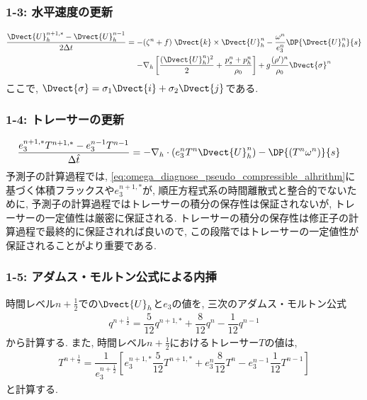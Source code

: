 \subsubsection*{1-3: 水平速度の更新}  
\vspace{-1cm}
\begin{align*}
 \dfrac{\Dvect{U}_h^{n+1,*} - \Dvect{U}_h^{n-1}}{2\Delta t}
 = -& (\zeta^n + f) \; \Dvect{k}\times\Dvect{U}^n_h 
   - \dfrac{\omega^n}{e_3^n} \DP{\Dvect{U}^n_h}{s} \nonumber \\
   -& \nabla_h \left[ \dfrac{(\Dvect{U}^n_h)^2}{2} 
      + \dfrac{p^n_s + p^n_h}{\rho_0} \right]
      + g\dfrac{(\rho')^n}{\rho_0}\Dvect{\sigma}^n 
\end{align*}
ここで, $\Dvect{\sigma}=\sigma_1 \Dvect{i} + \sigma_2 \Dvect{j}$である. 

\subsubsection*{1-4: トレーサーの更新}
\vspace{-1.2cm}
\begin{align*}
 \dfrac{e_3^{n+1,*}T^{n+1,*} - e_3^{n-1}T^{n-1}}{\Delta \hat{t}}
 = -& \nabla_h \cdot (e_3^n T^n \Dvect{U}_h^n)
   - \DP{(T^n \omega^n)}{s}
\end{align*}
予測子の計算過程では,
\eqref{eq:omega_diagnose_pseudo_compressible_alhrithm}に基づく体積フラックスや$e_3^{n+1,*}$が,
順圧方程式系の時間離散式と整合的でないために, 予測子の計算過程ではトレーサーの積分の保存性は保証されないが,   
トレーサーの一定値性は厳密に保証される. 
トレーサーの積分の保存性は修正子の計算過程で最終的に保証されれば良いので, 
この段階ではトレーサーの一定値性が保証されることがより重要である. 

\subsubsection*{1-5: アダムス・モルトン公式による内挿}
\vspace{-.5cm}
時間レベル$n+\frac{1}{2}$での$\Dvect{U}_h$と$e_3$の値を, 
三次のアダムス・モルトン公式
\begin{align*}
 q^{n+\frac{1}{2}} 
  =   \dfrac{5}{12}q^{n+1,*} 
    + \dfrac{8}{12}q^{n} 
    - \dfrac{1}{12}q^{n-1}  
\end{align*}
から計算する. 
また, 時間レベル$n+\frac{1}{2}$におけるトレーサー$T$の値は, 
\begin{align*}
 T^{n+\frac{1}{2}} 
  = \dfrac{1}{e_3^{n+\frac{1}{2}}} 
    \left[ 
      e_3^{n+1,*} \dfrac{5}{12}T^{n+1,*} 
    + e_3^n \dfrac{8}{12}T^{n} 
    - e_3^{n-1} \dfrac{1}{12}T^{n-1} \right]   
\end{align*}
と計算する. 


